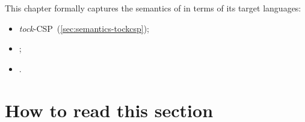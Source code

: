
\newcommand{\tockcsp}{\emph{tock}-CSP}
\newcommand{\cspm}{CSP\(_\text{M}\)}

\newcommand{\defeq}{\mathbin{\overset{\text{def}}=}}
\newcommand{\interrupt}{\mathbin{\triangle}}
\newcommand{\cspnsop}{\mathbin{\!:\!:\!}}
\newcommand{\cspkw}[1]{\operatorname{\mathbf{#1}}}
\newcommand{\runproc}[1]{\cspkw{Run}\left(#1\right)}
\newcommand{\events}{\cspkw{Events}}

%
%
\newcommand{\anarrow}{a}
\newcommand{\anevent}{e}
\newcommand{\agap}{g}
\newcommand{\amspec}{m}
\newcommand{\amsgset}{M}
\newcommand{\aloop}{l}
\newcommand{\anop}{o}
\newcommand{\aseq}{\sigma}
\newcommand{\asseq}{q}
\newcommand{\astep}{s}
\newcommand{\atarget}{t}
\newcommand{\aworld}{w}
\newcommand{\anaction}{x}
\newcommand{\asasst}{\alpha_s}
\newcommand{\amodel}{\mathcal{M}}

\newcommand{\sema}[1]{\llbracket #1 \rrbracket}
\newcommand{\stepsema}[1]{\sema{#1}^{\mathsf{step}}}
\newcommand{\gapsema}[2]{\sema{#1}^{\mathsf{gap}}_{(#2)}}
\newcommand{\actsema}[1]{\sema{#1}^{\mathsf{act}}}
\newcommand{\mspecsema}[1]{\sema{#1}^{\mathsf{mspec}}}
\newcommand{\loopsema}[1]{\sema{#1}^{\mathsf{loop}}}
\newcommand{\msgsetsema}[1]{\sema{#1}^{\mathsf{mset}}}
\newcommand{\seqsema}[1]{\sema{#1}^{\mathsf{seq}}}
\newcommand{\sseqsema}[1]{\sema{#1}^{\mathsf{sseq}}}
\newcommand{\asstsema}[1]{\sema{#1}^{\mathsf{sasst}}}

\newcommand{\funcname}[1]{\mathsf{#1}}
\newcommand{\eventsof}[1]{\funcname{events}(#1)}
\newcommand{\seqnameOf}[1]{\funcname{seqName}(#1)}

\newcommand{\field}[2]{#1.\funcname{#2}}

This chapter formally captures the semantics of \langname{} in terms of its
target languages:

\begin{itemize}
\item
	\tockcsp~(\cref{sec:semantics-tockcsp});
\item
	;
\item
	.
\end{itemize}

\section{How to read this section}

